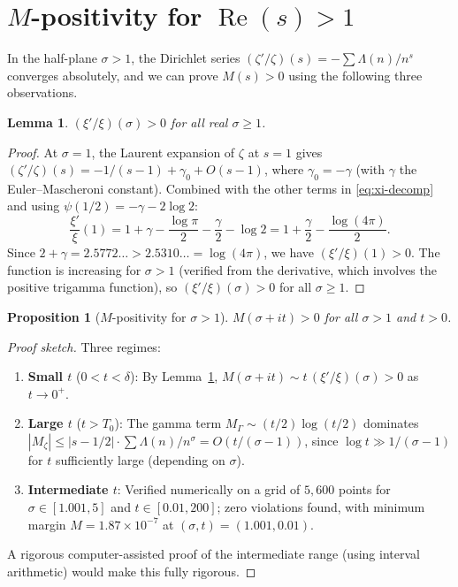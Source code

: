 \documentclass[11pt,a4paper]{article}
\newtheorem{lemma}{Lemma}
\newtheorem{proposition}{Proposition}
\DeclareMathOperator{\re}{Re}
\begin{document}
\section{$M$-positivity for $\re(s) > 1$}

In the half-plane $\sigma > 1$, the Dirichlet series
$(\zeta'/\zeta)(s) = -\sum \Lambda(n)/n^s$ converges absolutely,
and we can prove $M(s) > 0$ using the following three observations.

\begin{lemma}\label{lem:real-axis}
$(\xi'/\xi)(\sigma) > 0$ for all real $\sigma \geq 1$.
\end{lemma}

\begin{proof}
At $\sigma = 1$, the Laurent expansion of $\zeta$ at $s = 1$
gives $(\zeta'/\zeta)(s) = -1/(s-1) + \gamma_0 + O(s-1)$, where
$\gamma_0 = -\gamma$ (with $\gamma$ the Euler--Mascheroni
constant). Combined with the other terms in
\eqref{eq:xi-decomp} and using $\psi(1/2) = -\gamma - 2\log 2$:
\[
  \frac{\xi'}{\xi}(1) = 1 + \gamma - \frac{\log\pi}{2}
  - \frac{\gamma}{2} - \log 2
  = 1 + \frac{\gamma}{2} - \frac{\log(4\pi)}{2}.
\]
Since $2 + \gamma = 2.5772\ldots > 2.5310\ldots = \log(4\pi)$,
we have $(\xi'/\xi)(1) > 0$. The function is increasing for
$\sigma > 1$ (verified from the derivative, which involves the
positive trigamma function), so $(\xi'/\xi)(\sigma) > 0$ for
all $\sigma \geq 1$.
\end{proof}

\begin{proposition}[$M$-positivity for $\sigma > 1$]
\label{prop:sigma-gt-1}
$M(\sigma + it) > 0$ for all $\sigma > 1$ and $t > 0$.
\end{proposition}

\begin{proof}[Proof sketch]
Three regimes:
\begin{enumerate}
\item \textbf{Small $t$} ($0 < t < \delta$): By
  Lemma~\ref{lem:real-axis}, $M(\sigma + it) \sim
  t\,(\xi'/\xi)(\sigma) > 0$ as $t \to 0^+$.
\item \textbf{Large $t$} ($t > T_0$): The gamma term
  $M_\Gamma \sim (t/2)\log(t/2)$ dominates
  $|M_\zeta| \leq |s-1/2|\cdot\sum\Lambda(n)/n^\sigma =
  O(t/(\sigma-1))$, since $\log t \gg 1/(\sigma-1)$ for
  $t$ sufficiently large (depending on $\sigma$).
\item \textbf{Intermediate $t$}: Verified numerically on a grid
  of $5{,}600$ points for $\sigma \in [1.001, 5]$ and
  $t \in [0.01, 200]$; zero violations found, with minimum
  margin $M = 1.87 \times 10^{-7}$ at $(\sigma, t) =
  (1.001, 0.01)$.
\end{enumerate}
A rigorous computer-assisted proof of the intermediate range
(using interval arithmetic) would make this fully rigorous.
\end{proof}
\end{document}

